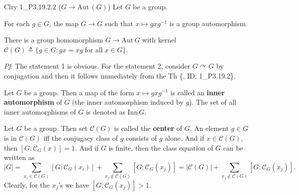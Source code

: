 \documentclass{article}
\newcommand{\act}{\curvearrowright}
\newcommand{\Auto}{\text{Aut}\,}
\newcommand{\Inn}{\text{Inn}\,}
\begin{document}
\begin{Th}{Clry 1\_P3.19.2.2 ($G\to \Auto (G)$)}
    Let $G$ be a group. 
    \begin{compactenum}
        \item For each $g\in G$, the map $G\to G$ such that $x\mapsto gxg^{-1}$ is a group automorphism.
        \item There is a group homomorphism $G\to \Auto G$ with kernel $\mathcal{C}(G)\triangleq \{g\in G: gx = xg\;\text{for all}\; x\in G\}$. 
    \end{compactenum}
    \tcblower
    \textit{Pf}: The statement 1 is obvious. For the statement 2, consider $G\act G$ by conjugation and then it follows immediately from the Th \{, ID: 1\_P3.19.2\}.
\end{Th}

\begin{Rmk}{}
    \begin{compactenum}
        \item \textcolor{Df}{Let $G$ be a group. Then a map of the form $x\mapsto gxg^{-1}$ is called an \textbf{inner automorphism} of $G$ (the inner automorphism induced by $g$). The set of all inner automorphisms of $G$ is denoted as $\Inn G$.}
        \item \textcolor{Df}{Let $G$ be a group. Then set $\mathcal{C}(G)$ is called the \textbf{center} of $G$.} \textcolor{Th}{An element $g\in G$ is in $\mathcal{C}(G)$ iff the conjugacy class of $g$ consists of $g$ alone.} And \textcolor{Th}{if $x\in \mathcal{C}(G)$, then $[G: \mathcal{C}_G(x)] = 1$.} And \textcolor{Th}{if $G$ is finite, then the class equation of $G$ can be written as
        $$ |G| = \sum_{x_i\in\mathcal{C}(G)} [G: \mathcal{C}_G(x_i)] + \sum_{x_j\notin\mathcal{C}(G)} [G: \mathcal{C}_G(x_j)] = |\mathcal{C}(G)| + \sum_{x_j\notin\mathcal{C}(G)} [G: \mathcal{C}_G(x_j)]. $$
        Clearly, for the $x_j$'s we have $[G: \mathcal{C}_G(x_j)] > 1$.}
    \end{compactenum}
\end{Rmk}
\end{document}
